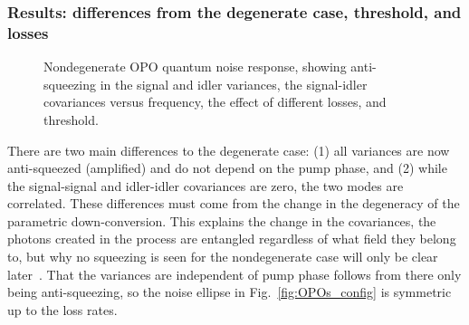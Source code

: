 \subsubsection{Results: differences from the degenerate case, threshold, and losses}
\label{sec:nOPO_results}

\begin{figure}
	\centering
	\caption{Nondegenerate OPO quantum noise response, showing anti-squeezing in the signal and idler variances, the signal-idler covariances versus frequency, the effect of different losses, and threshold.}
	\label{fig:nOPO_variances}
\end{figure}


There are two main differences to the degenerate case: (1) all variances are now anti-squeezed (amplified) and do not depend on the pump phase, and (2) while the signal-signal and idler-idler covariances are zero, the two modes are correlated. These differences must come from the change in the degeneracy of the parametric down-conversion.
This explains the change in the covariances, the photons created in the process are entangled regardless of what field they belong to, but why no squeezing is seen for the nondegenerate case will only be clear later~\cite{}.
That the variances are independent of pump phase follows from there only being anti-squeezing, so the noise ellipse in Fig.~\ref{fig:OPOs_config} is symmetric up to the loss rates.

